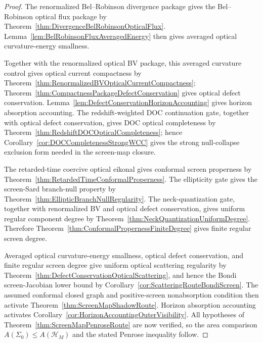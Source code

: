 \begin{proof}
The renormalized Bel--Robinson divergence package gives the Bel--Robinson optical flux package by Theorem~\ref{thm:DivergenceBelRobinsonOpticalFlux}. Lemma~\ref{lem:BelRobinsonFluxAveragedEnergy} then gives averaged optical curvature-energy smallness.

Together with the renormalized optical BV package, this averaged curvature control gives optical current compactness by Theorem~\ref{thm:RenormalizedBVOpticalCurrentCompactness}; Theorem~\ref{thm:CompactnessPackageDefectConservation} gives optical defect conservation. Lemma~\ref{lem:DefectConservationHorizonAccounting} gives horizon absorption accounting. The redshift-weighted DOC continuation gate, together with optical defect conservation, gives DOC optical completeness by Theorem~\ref{thm:RedshiftDOCOpticalCompleteness}; hence Corollary~\ref{cor:DOCCompletenessStrongWCC} gives the strong null-collapse exclusion form needed in the screen-map closure.

The retarded-time coercive optical eikonal gives conformal screen properness by Theorem~\ref{thm:RetardedTimeConformalProperness}. The ellipticity gate gives the screen-Sard branch-null property by Theorem~\ref{thm:EllipticBranchNullRegularity}. The neck-quantization gate, together with renormalized BV and optical defect conservation, gives uniform regular component degree by Theorem~\ref{thm:NeckQuantizationUniformDegree}. Therefore Theorem~\ref{thm:ConformalPropernessFiniteDegree} gives finite regular screen degree.

Averaged optical curvature-energy smallness, optical defect conservation, and finite regular screen degree give uniform optical scattering regularity by Theorem~\ref{thm:DefectConservationOpticalScattering}, and hence the Bondi screen-Jacobian lower bound by Corollary~\ref{cor:ScatteringRouteBondiScreen}. The assumed conformal closed graph and positive-screen nonabsorption condition then activate Theorem~\ref{thm:ScreenMapShadowRoute}. Horizon absorption accounting activates Corollary~\ref{cor:HorizonAccountingOuterVisibility}. All hypotheses of Theorem~\ref{thm:ScreenMapPenroseRoute} are now verified, so the area comparison $A(\Sigma_0)\le A(\mathcal H_M)$ and the stated Penrose inequality follow.
\end{proof}

